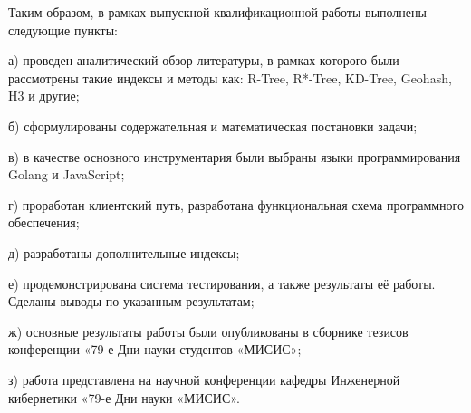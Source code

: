 {}

Таким образом, в рамках выпускной квалификационной работы выполнены следующие пункты:
\par а) проведен аналитический обзор литературы, в рамках которого были рассмотрены такие индексы и методы как: R-Tree, R*-Tree, KD-Tree, Geohash, H3 и другие;
\par б) сформулированы содержательная и математическая постановки задачи;
\par в) в качестве основного инструментария были выбраны языки программирования Golang и JavaScript;
\par г) проработан клиентский путь, разработана функциональная схема программного обеспечения;
\par д) разработаны дополнительные индексы;
\par е) продемонстрирована система тестирования, а также результаты её работы. Сделаны выводы по указанным результатам;
\par ж) основные результаты работы были опубликованы в сборнике тезисов конференции «79-е Дни науки студентов «МИСИС»\cite{ibragimov};
\par з) работа представлена на научной конференции кафедры Инженерной кибернетики «79-е Дни науки «МИСИС»\cite{ibragimov}.
